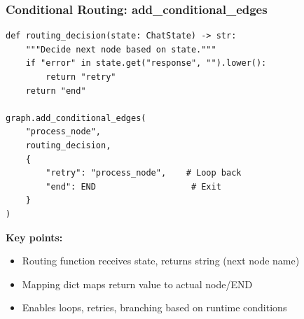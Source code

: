 \documentclass[aspectratio=169,11pt]{beamer}
\begin{document}
\begin{frame}[fragile]
\frametitle{Conditional Routing: add\_conditional\_edges}
\begin{lstlisting}
def routing_decision(state: ChatState) -> str:
    """Decide next node based on state."""
    if "error" in state.get("response", "").lower():
        return "retry"
    return "end"

graph.add_conditional_edges(
    "process_node",
    routing_decision,
    {
        "retry": "process_node",    # Loop back
        "end": END                   # Exit
    }
)
\end{lstlisting}

\vspace{10pt}
\textbf{Key points:}
\begin{itemize}
    \setlength{\itemsep}{1pt}
  \item Routing function receives state, returns string (next node name)
  \item Mapping dict maps return value to actual node/END
  \item Enables loops, retries, branching based on runtime conditions
\end{itemize}
\end{frame}
\end{document}
